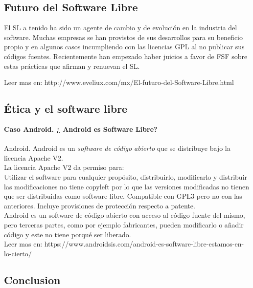 \documentclass{book}
\begin{document}
\subsection{Futuro del Software Libre}


	El SL a tenido ha sido un agente de cambio y de evolución en la industria del software.
Muchas empresas se han provistos de sus desarrollos para su beneficio propio y en algunos casos incumpliendo con las licencias GPL al no publicar sus códigos fuentes.
	Recientemente han empezado haber juicios a favor de FSF sobre estas prácticas que afirman y renuevan el SL.

Leer mas en: http://www.eveliux.com/mx/El-futuro-del-Software-Libre.html

\subsection{Ética y el software libre}

{\bf Caso Android. ¿ Android es Software Libre?}
\\
\\
Android. Android es un \emph{software de código abierto} que se distribuye bajo la licencia Apache V2.
\\
La licencia Apache V2 da permiso para:
\\
Utilizar el software para cualquier propósito, distribuirlo, modificarlo y distribuir las modificaciones
no tiene copyleft por lo que las versiones modificadas no tienen que ser distribuidas como software libre.
Compatible con GPL3 pero no con las anteriores.
Incluye provisiones de protección respecto a patente.
\\
Android es un software de código abierto con  acceso al código fuente del mismo, pero terceras partes, como por ejemplo fabricantes, pueden modificarlo o añadir código y este no tiene porqué ser liberado. 
\\
Leer mas en: https://www.androidsis.com/android-es-software-libre-estamos-en-lo-cierto/

\subsection{Conclusion}
	
\end{document}
